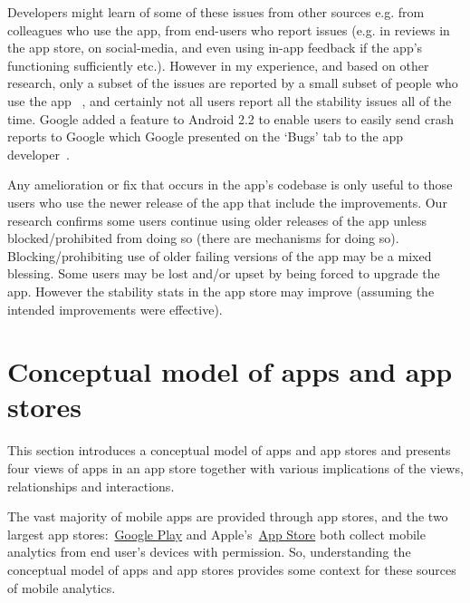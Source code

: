 Developers might learn of some of these issues from other sources e.g. from colleagues who use the app, from end-users who report issues (e.g. in reviews in the app store, on social-media, and even using in-app feedback if the app's functioning sufficiently etc.). 
However in my experience, and based on other research, only a subset of the issues are reported by a small subset of people who use the app~ %
, and certainly not all users report all the stability issues all of the time. Google added a feature to Android 2.2 to enable users to easily send crash reports to Google which Google presented on the `Bugs' tab to the app developer~.

Any amelioration or fix that occurs in the app's codebase is only useful to those users who use the newer release of the app that include the improvements. Our research confirms some users continue using older releases of the app unless blocked/prohibited from doing so (there are mechanisms for doing so). Blocking/prohibiting use of older failing versions of the app may be a mixed blessing. Some users may be lost and/or upset by being forced to upgrade the app. However the stability stats in the app store may improve (assuming the intended improvements were effective).


\section{Conceptual model of apps and app stores}
This section introduces a conceptual model of apps and app stores and presents four views of apps in an app store together with various implications of the views, relationships and interactions. 

The vast majority of mobile apps are provided through app stores, and the two largest app stores:~\href{https://play.google.com/store/apps}{Google Play} and Apple's~\href{https://www.apple.com/app-store/}{App Store} both collect mobile analytics from end user's devices with permission. So, understanding the conceptual model of apps and app stores provides some context for these sources of mobile analytics. 

